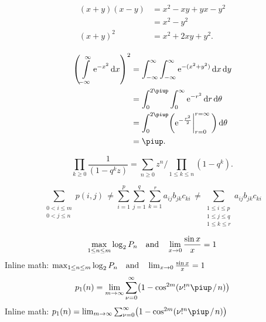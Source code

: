 
	\begin{align*}
	\begin{aligned}
	(x+y)(x-y)&=x^2-xy+yx-y^2\\
	&=x^2-y^2\\
	(x+y)^2&=x^2+2xy+y^2.
	\end{aligned}
	\end{align*}


	\begin{align*}
	\begin{aligned}
	\left( \int\limits_{-\infty}^\infty \mathup{e}^{-x^2}\,\mathup{d}x \right)^2
	&=\int_{-\infty}^\infty\int_{-\infty}^\infty \mathup{e}^{-(x^2+y^2)}\,\mathup{d}x\,\mathup{d}y\\
	&=\int_0^{2\piup}\int_0^\infty \mathup{e}^{-r^2}\,\mathup{d}r\,\mathup{d}\theta\\
	&=\int_0^{2\piup}\biggl(\mathup{e}^{-\frac{r^2}{2}}\biggl|_{r=0}^{r=\infty}\,\biggr)\,\mathup{d}\theta\\
	&=\piup.
	\end{aligned}
	\end{align*}



	$$\prod_{k\ge0}\frac{1}{(1-q^kz)}=
	\sum_{n\ge0}z^n \bigg/ \!\!\prod_{1\le k\le n}(1-q^k).$$

	$$\sum_{\substack{\scriptstyle 0< i\le m\\\scriptstyle0<j\le n}}p(i,j) \,\ne
	\sum_{i=1}^p \sum_{j=1}^q \sum_{k=1}^r a_{ij} b_{jk} c_{ki} \,\ne
	\sum_{\substack{\scriptstyle 1\le i\le p \\ \scriptstyle 1\le j\le q\\
			\scriptstyle 1\le k\le r}} a_{ij} b_{jk} c_{ki}$$

	$$\max_{1\le n\le m}\log_2P_n \quad \hbox{and} \quad
	\lim_{x\to0}\frac{\sin x}{x}=1$$
	Inline math:
	$\max_{1\le n\le m}\log_2P_n \quad \hbox{and} \quad
	\lim_{x\to0}\frac{\sin x}{x}=1$
	$$p_1(n)=\lim_{m\to\infty}\sum_{\nu=0}^\infty\bigl(1-\cos^{2m}(\nu!^n\piup \divslash n)\bigr)$$
	Inline math:
	$p_1(n)=\lim_{m\to\infty}\sum_{\nu=0}^\infty\bigl(1-\cos^{2m}(\nu!^n\piup \divslash n)\bigr)$

